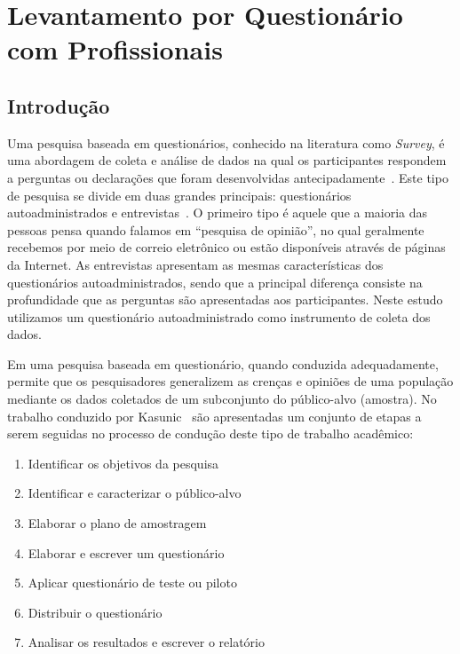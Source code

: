 \chapter{Levantamento por Questionário com Profissionais}
\label{ch:pesquisa-profissionais}

\section{Introdução}
\label{sec:pesquisa-profissionais-intro}

Uma pesquisa baseada em questionários, conhecido na literatura como
\textit{Survey}, é uma abordagem de coleta e análise de dados na qual os
participantes respondem a perguntas ou declarações que foram desenvolvidas
antecipadamente~\cite{kasunic2005designing}. Este tipo de pesquisa se divide em
duas grandes principais: questionários autoadministrados e
entrevistas~\cite{kasunic2005designing}. O primeiro tipo é aquele que  a maioria
das pessoas pensa quando falamos em  ``pesquisa de opinião'', no qual geralmente
recebemos por meio de correio eletrônico ou estão disponíveis através de páginas
da Internet. As entrevistas apresentam as mesmas características dos
questionários autoadministrados, sendo que a principal diferença consiste na
profundidade que as perguntas são apresentadas aos participantes.  Neste estudo
utilizamos um questionário autoadministrado como instrumento de coleta dos
dados.

Em uma pesquisa baseada em questionário, quando conduzida adequadamente, permite
que os pesquisadores generalizem as crenças e opiniões de uma população mediante
os dados coletados de um subconjunto do público-alvo (amostra). No trabalho
conduzido por Kasunic~\cite{kasunic2005designing} são apresentadas um conjunto
de etapas a serem seguidas no processo de condução deste tipo de trabalho
acadêmico:

\begin{enumerate}
\item{Identificar os objetivos da pesquisa}
\item{Identificar e caracterizar o público-alvo}
\item{Elaborar o plano de amostragem}
\item{Elaborar e escrever um questionário}
\item{Aplicar questionário de teste ou piloto}
\item{Distribuir o questionário}
\item{Analisar os resultados e escrever o relatório}
\end{enumerate}

